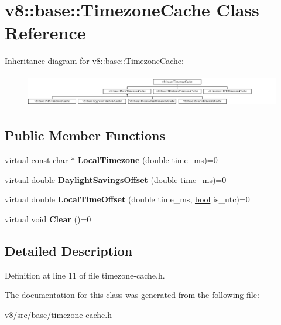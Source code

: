 \hypertarget{classv8_1_1base_1_1TimezoneCache}{}\section{v8\+:\+:base\+:\+:Timezone\+Cache Class Reference}
\label{classv8_1_1base_1_1TimezoneCache}
Inheritance diagram for v8\+:\+:base\+:\+:Timezone\+Cache\+:\begin{figure}[H]
\begin{center}
\leavevmode
\includegraphics[height=1.442060cm]{classv8_1_1base_1_1TimezoneCache}
\end{center}
\end{figure}
\subsection*{Public Member Functions}
\begin{DoxyCompactItemize}
\item 
\mbox{\label{classv8_1_1base_1_1TimezoneCache_a9ba134992875f89981d8966b304b5667}} 
virtual const \mbox{\hyperlink{classchar}{char}} $\ast$ {\bfseries Local\+Timezone} (double time\+\_\+ms)=0
\item 
\mbox{\label{classv8_1_1base_1_1TimezoneCache_a6e4d71ee33819aad868e9cadc6d96cd8}} 
virtual double {\bfseries Daylight\+Savings\+Offset} (double time\+\_\+ms)=0
\item 
\mbox{\label{classv8_1_1base_1_1TimezoneCache_a2be33f35f345692c7f667c1049d0a8aa}} 
virtual double {\bfseries Local\+Time\+Offset} (double time\+\_\+ms, \mbox{\hyperlink{classbool}{bool}} is\+\_\+utc)=0
\item 
\mbox{\label{classv8_1_1base_1_1TimezoneCache_a27a6093e2e3fa57f589e1c6d05ca65c9}} 
virtual void {\bfseries Clear} ()=0
\end{DoxyCompactItemize}


\subsection{Detailed Description}


Definition at line 11 of file timezone-\/cache.\+h.



The documentation for this class was generated from the following file\+:\begin{DoxyCompactItemize}
\item 
v8/src/base/timezone-\/cache.\+h\end{DoxyCompactItemize}
